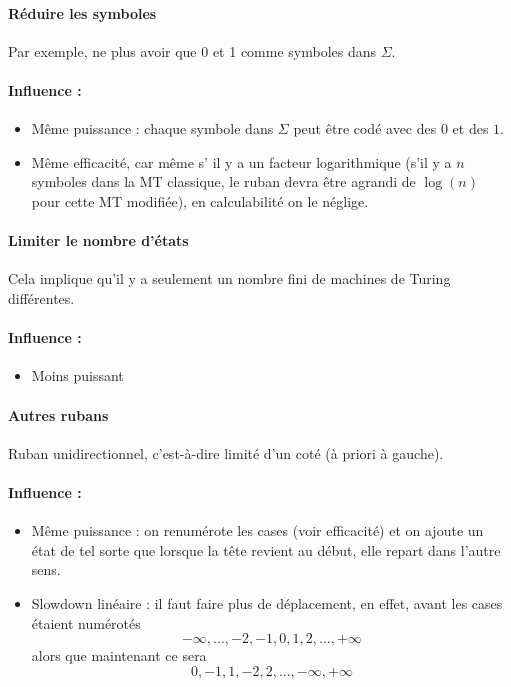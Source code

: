 \paragraph{Réduire les symboles} Par exemple, ne plus avoir que 0 et 1 comme
symboles dans $\Sigma$.

\paragraph{Influence :}
\begin{itemize}
	\item Même puissance : chaque symbole dans $\Sigma$ peut être codé avec des $0$ et des $1$.
	\item Même efficacité, car même s’ il y a un facteur logarithmique (s'il y a $n$ symboles dans la MT classique, le ruban devra être agrandi de $\log(n)$ pour cette MT modifiée), en calculabilité on le néglige.
\end{itemize}

\paragraph{Limiter le nombre d'états} Cela implique qu'il y a seulement un nombre fini de machines de Turing différentes.

\paragraph{Influence :}
\begin{itemize}
	\item Moins puissant
\end{itemize}

\paragraph{Autres rubans}

Ruban unidirectionnel, c'est-à-dire limité d'un coté (à priori à gauche).

\paragraph{Influence :}
\begin{itemize}
	\item Même puissance : on renumérote les cases (voir efficacité) et on ajoute un état de tel sorte que lorsque la tête revient au début, elle repart dans l'autre sens.
	\item Slowdown linéaire : il faut faire plus de déplacement, en
		effet, avant les cases étaient numérotés
		$$-\infty,...,-2,-1,0,1,2,...,+\infty$$
		alors que maintenant ce sera
	    $$0,-1,1,-2,2,...,-\infty,+\infty$$
\end{itemize}

